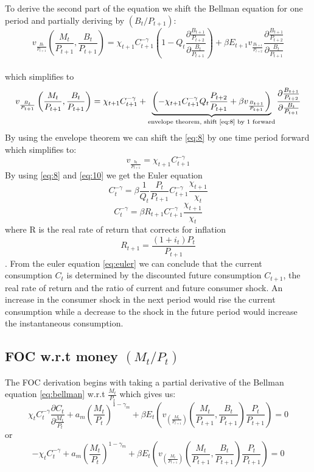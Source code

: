 \documentclass[10pt,a4paper]{article}
\begin{document}
To derive the second part of the equation we shift the Bellman equation for one period and partially deriving by $(B_{t}/P_{t+1})$:
$$v_{\frac{B_t}{P_{t+1}}} \left(  \frac{M_t}{P_{t+1}}, \frac{B_t}{P_{t+1}}\right)=\chi_{t+1} C_{t+1}^{-\gamma} \left( 1 - Q_{t} \frac{\partial \frac{B_{t+1}}{P_{t+2}}}{\partial \frac{B_t}{P_{t+1}}}\right)  + \beta E_{t+1} v_{\frac{B_{t+1}}{P_{t+2}}} \frac{\partial \frac{B_{t+1}}{P_{t+2}}}{\partial \frac{B_t}{P_{t+1}}} $$\\
which simplifies to
\begin{equation}
v_{\frac{B_t}{P_{t+1}}} \left(  \frac{M_t}{P_{t+1}}, \frac{B_t}{P_{t+1}}\right)=\chi_{t+1} C_{t+1}^{-\gamma}
+ 
\underbrace{
\left( -\chi_{t+1} C_{t+1}^{-\gamma}Q_{t}\frac{P_{t+2}}{P_{t+1}}+ \beta v_{\frac{B_{t+1}}{P_{t+1}}} \right)
}_{\text{envelope theorem, shift \eqref{eq:8} by 1 forward}}
\frac{\partial \frac{B_{t+1}}{P_{t+2}}}{\partial \frac{B_t}{P_{t+1}}}
\end{equation}
By using the envelope theorem we can shift the \eqref{eq:8} by one time period forward which simplifies to:
\begin{equation}
v_{\frac{b_{t}}{P_{t+1}}} = \chi_{t+1}C_{t+1}^{-\gamma}
\end{equation}\label{eq:10}
By using \eqref{eq:8} and \eqref{eq:10} we get the Euler equation
\begin{equation}
C_t^{-\gamma}= \beta \frac{1}{Q_{t}} \frac{P_{t}}{P_{t+1}} C_{t+1}^{-\gamma}\frac{\chi_{t+1}}{\chi_t}
\end{equation}
\begin{equation}\label{eq:euler} 
C_t^{-\gamma}= \beta R_{t+1} C_{t+1}^{-\gamma}\frac{\chi_{t+1}}{\chi_t}
\end{equation}
where R is the real rate of return that corrects for inflation
$$R_{t+1} = \frac{(1+i_t) P_t}{P_{t+1}}$$.
From the euler equation \eqref{eq:euler} we can conclude that the current consumption $C_{t}$ is determined by the discounted future consumption $C_{t+1}$, the real rate of return and the ratio of current and future consumer shock. An increase in the consumer shock in the next period would rise the current consumption while a decrease to the shock in the future period would increase the instantaneous consumption.

\subsection{FOC w.r.t money $(M_{t}/P_{t})$}
The FOC derivation begins with taking a partial derivative of the Bellman equation \eqref{eq:bellman} w.r.t $\frac{M_{t}}{P_{t}}$ which gives us:
\begin{equation*}
\chi_{t}C_{t}^{-\gamma}\frac{\partial C_{t}}{\partial \frac{M_{t}}{P_{t}}} + a_{m}(\frac{M_{t}}{P_{t}})^{1-\gamma_{m}}+ \beta E_{t}( v_{(\frac{M_{t}}{P_{t+1}})}(\frac{M_{t}}{P_{t+1}},\frac{B_{t}}{P_{t+1}})\frac{P_{t}}{P_{t+1}})=0
\end{equation*}
or
\begin{equation}\label{eq:13}
-\chi_{t}C_{t}^{-\gamma} + a_{m}(\frac{M_{t}}{P_{t}})^{1-\gamma_{m}}+ \beta E_{t}( v_{(\frac{M_{t}}{P_{t+1}})}(\frac{M_{t}}{P_{t+1}},\frac{B_{t}}{P_{t+1}})\frac{P_{t}}{P_{t+1}})=0
\end{equation}
\end{document}
